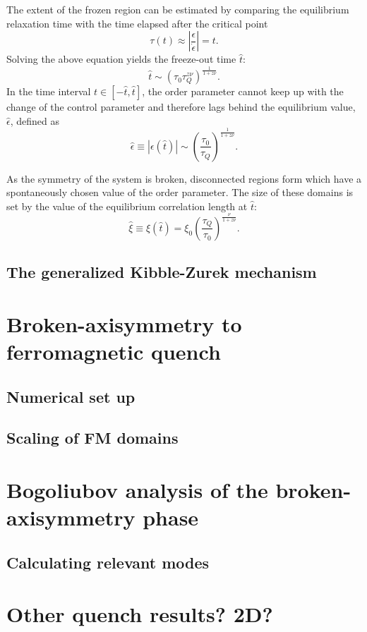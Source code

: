 The extent of the frozen region can be estimated by comparing the equilibrium
relaxation time with the time elapsed after the critical point
\begin{equation}
    \tau(t) \approx \left|\frac{\epsilon}{\dot{\epsilon}}\right|=t.
\end{equation}
Solving the above equation yields the freeze-out time $\hat{t}$:
\begin{equation}
    \hat{t} \sim (\tau_0\tau_Q^{z\nu})^{\frac{1}{1+z\nu}}.
\end{equation}
In the time interval $t \in [-\hat{t}, \hat{t}]$, the order parameter cannot
keep up with the change of the control parameter and therefore lags
behind the equilibrium value, $\hat{\epsilon}$, defined as
\begin{equation}
    \hat{\epsilon} \equiv |\epsilon(\hat{t})| \sim 
    \left(\frac{\tau_0}{\tau_Q}\right)^\frac{1}{1+z\nu}.
\end{equation}

As the symmetry of the system is broken, disconnected regions form which
have a spontaneously chosen value of the order parameter.
The size of these domains is set by the value of the equilibrium correlation
length at $\hat{t}$:
\begin{equation}
    \hat{\xi} \equiv \xi(\hat{t}) 
    = \xi_0 \left(\frac{\tau_Q}{\tau_0}\right)^\frac{\nu}{1 + z\nu}.
\end{equation}



\subsection{The generalized Kibble-Zurek mechanism}

\section{Broken-axisymmetry to ferromagnetic quench}

\subsection{Numerical set up}
\subsection{Scaling of FM domains}

\section{Bogoliubov analysis of the broken-axisymmetry phase}
\subsection{Calculating relevant modes}

\section{Other quench results? 2D?}
